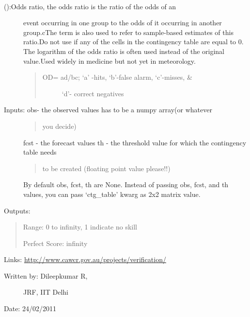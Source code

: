 \documentclass[letterpaper,10pt,english]{sphinxmanual}
\begin{document}

\begin{fulllineitems}
\label{diagnosis:ctgfunction.odr}~\begin{description}
\item[{{\hyperref[diagnosis:ctgfunction.odr]{}} ():Odds ratio, the odds ratio is the ratio of the odds of an}] \leavevmode
event occurring in one group to the odds of it occurring in
another group.cThe term is also used to refer to sample-based
estimates of this ratio.Do not use if any of the cells in the
contingency table are equal to 0. The logarithm of the odds
ratio is often used instead of the original value.Used widely
in medicine but not yet in meteorology.
\begin{quote}
\begin{description}
\item[{OD= ad/bc; `a' -hits, `b'-false alarm, `c'-misses, \&}] \leavevmode
`d'- correct negatives

\end{description}
\end{quote}

\item[{Inputs: obs- the observed values has to be a numpy array(or whatever}] \leavevmode\begin{quote}

you decide)
\end{quote}

fcst - the forecast values
th  - the threshold value for which the contingency table needs
\begin{quote}

to be created (floating point value please!!)
\end{quote}

By default obs, fcst, th are None. Instead of passing obs, fcst,
and th values, you can pass `ctg\_table' kwarg as 2x2 matrix value.

\end{description}

Outputs:
\begin{quote}

Range: 0 to infinity, 1 indicate no skill

Perfect Score: infinity
\end{quote}

Links: \href{http://www.cawcr.gov.au/projects/verification/}{http://www.cawcr.gov.au/projects/verification/}
\begin{description}
\item[{Written by: Dileepkumar R,}] \leavevmode
JRF, IIT Delhi

\end{description}

Date: 24/02/2011

\end{fulllineitems}
\end{document}
